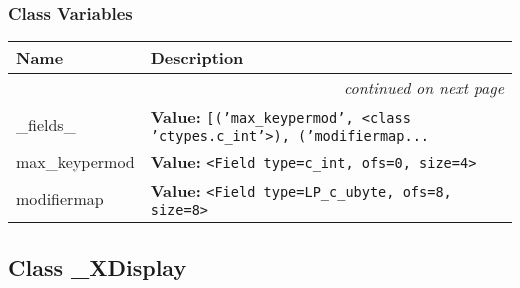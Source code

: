
  \subsubsection{Class Variables}

    \vspace{-1cm}
\hspace{\varindent}\begin{longtable}{|p{\varnamewidth}|p{\vardescrwidth}|l}
\cline{1-2}
\cline{1-2} \centering \textbf{Name} & \centering \textbf{Description}& \\
\cline{1-2}
\endhead\cline{1-2}\multicolumn{3}{r}{\small\textit{continued on next page}}\\\endfoot\cline{1-2}
\endlastfoot\raggedright \_\-f\-i\-e\-l\-d\-s\-\_\- & \raggedright \textbf{Value:} 
{\tt \texttt{[}\texttt{(}\texttt{'}\texttt{max\_keypermod}\texttt{'}\texttt{, }{\textless}class 'ctypes.c\_int'{\textgreater}\texttt{)}\texttt{, }\texttt{(}\texttt{'}\texttt{modifiermap}\texttt{...}}&\\
\cline{1-2}
\raggedright m\-a\-x\-\_\-k\-e\-y\-p\-e\-r\-m\-o\-d\- & \raggedright \textbf{Value:} 
{\tt {\textless}Field type=c\_int, ofs=0, size=4{\textgreater}}&\\
\cline{1-2}
\raggedright m\-o\-d\-i\-f\-i\-e\-r\-m\-a\-p\- & \raggedright \textbf{Value:} 
{\tt {\textless}Field type=LP\_c\_ubyte, ofs=8, size=8{\textgreater}}&\\
\cline{1-2}
\end{longtable}



\subsection{Class \_XDisplay}

